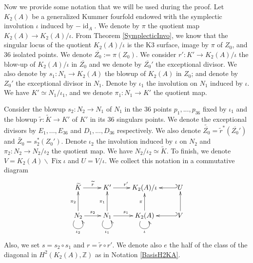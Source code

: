 \documentclass{alggeom}
\DeclareMathOperator{\id}{id}
\DeclareMathOperator{\Fix}{Fix}
\newcommand{\Z}{\mathbb{Z}}
\theoremstyle{plain}
\theoremstyle{definition}
\theoremstyle{remark}
\begin{document}
Now we provide some notation that we will be used during the proof.
Let $K_{2}(A)$ be a generalized Kummer fourfold endowed with the symplectic involution $\iota$ induced by $-\id_A$.
We denote by $\pi$ the quotient map $K_{2}(A)\rightarrow K_{2}(A)/\iota$.
From Theorem \ref{SymplecticInvo}, we know that the singular locus of the quotient $K_{2}(A)/\iota$ is the K3 surface, image by $\pi$ of $Z_{0}$, and 36 isolated points. We denote $\overline{Z_{0}}:=\pi(Z_{0})$. 
We consider $r':K'\rightarrow K_{2}(A)/\iota$ the blow-up of $K_{2}(A)/\iota$ in $\overline{Z_{0}}$ and we denote by $\overline{Z_{0}}'$ the exceptional divisor.
We also denote by $s_{1}:N_{1}\rightarrow K_{2}(A)$ the blowup of $K_{2}(A)$ in $Z_{0}$; and denote by $Z_{0}'$ the exceptional divisor in $N_{1}$. Denote by $\iota_{1}$ the involution on $N_{1}$ induced by $\iota$. We have $K'\simeq N_{1}/\iota_{1}$, and we denote $\pi_{1}:N_{1}\rightarrow K'$ the quotient map.

Consider the blowup $s_{2}:N_{2}\rightarrow N_{1}$ of $N_{1}$ in the 36 points $p_1,...,p_{36}$ fixed by $\iota_{1}$ and the blowup $\widetilde{r}:\widetilde{K}\rightarrow K'$ of $K'$ in its 36 singulars points. We denote the exceptional divisors by $E_{1},...,E_{36}$ and $D_{1},...,D_{36}$ respectively. We also denote $\widetilde{\overline{Z_{0}}}=\widetilde{r}^{*}(\overline{Z_{0}}')$ and $\widetilde{Z_{0}}=s_{2}^{*}(Z_{0}')$.
Denote $\iota_{2}$ the involution induced by $\iota$ on $N_{2}$ and $\pi_{2}:N_{2}\rightarrow N_{2}/\iota_{2}$ the quotient map. 
We have $N_{2}/\iota_{2}\simeq \widetilde{K}$. To finish, we denote $V=K_{2}(A)\smallsetminus \Fix \iota$ and $U=V/\iota$. We collect this notation in a commutative diagram
\begin{equation}
\xymatrix{
 \widetilde{K}\ar[r]^{\widetilde{r}} & K' \ar[r]^{r'}&  K_{2}(A)/\iota&U\ar@{_{(}->}[l]\\
  N_{2}\ar@(dl,dr)[]_{\iota_{2}} \ar[r]^{s_{2}} \ar[u]^{\pi_{2}}& N_{1}\ar@(dl,dr)[]_{\iota_{1}} \ar[r]^{s_{1}} \ar[u]^{\pi_{1}} & K_{2}(A)\ar@(dl,dr)[]_{\iota}\ar[u]^{\pi}&V\ar[u]\ar@{_{(}->}[l]
   }
   \label{commutativediagram}
\end{equation} 
Also, we set $s=s_2\circ s_1$ and $r=\widetilde{r}\circ r'$. We denote also $e$ the half of the class of the diagonal in $H^{2}(K_2(A),\Z)$ as in Notation \ref{BasisH2KA}.
\end{document}
